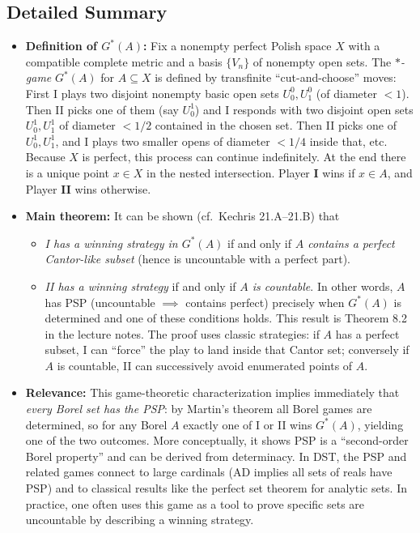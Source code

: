 \documentclass[11pt]{article}
\begin{document}
\subsection{Detailed Summary}
\label{detailed-summary-4}
\begin{itemize}
\item \textbf{Definition of \(G^*(A)\):} Fix a nonempty perfect Polish space \(X\)
with a compatible complete metric and a basis \(\{V_n\}\) of nonempty
open sets. The \emph{\(\ast\)-game} \(G^*(A)\) for \(A\subseteq X\) is
defined by transfinite “cut-and-choose” moves: First I plays two
disjoint nonempty basic open sets \(U_0^0,U_1^0\) (of diameter
\(<1\)). Then II picks one of them (say \(U^1_0\)) and I responds with
two disjoint open sets \(U_0^1,U_1^1\) of diameter \(<1/2\) contained
in the chosen set. Then II picks one of \(U_0^1,U_1^1\), and I plays
two smaller opens of diameter \(<1/4\) inside that, etc. Because \(X\)
is perfect, this process can continue indefinitely. At the end there
is a unique point \(x\in X\) in the nested intersection. Player \textbf{I}
wins if \(x\in A\), and Player \textbf{II} wins otherwise.

\item \textbf{Main theorem:} It can be shown (cf. Kechris 21.A--21.B) that

\begin{itemize}
\item \emph{I has a winning strategy in \(G^*(A)\)} if and only if \emph{\(A\)
contains a perfect Cantor-like subset} (hence is uncountable with a
perfect part).
\item \emph{II has a winning strategy} if and only if \emph{\(A\) is countable}. In
other words, \(A\) has PSP (uncountable \(\implies\) contains
perfect) precisely when \(G^*(A)\) is determined and one of these
conditions holds. This result is Theorem 8.2 in the lecture notes.
The proof uses classic strategies: if \(A\) has a perfect subset, I
can “force” the play to land inside that Cantor set; conversely if
\(A\) is countable, II can successively avoid enumerated points of
\(A\).
\end{itemize}

\item \textbf{Relevance:} This game-theoretic characterization implies immediately
that \emph{every Borel set has the PSP}: by Martin's theorem all Borel
games are determined, so for any Borel \(A\) exactly one of I or II
wins \(G^*(A)\), yielding one of the two outcomes. More conceptually,
it shows PSP is a “second-order Borel property” and can be derived
from determinacy. In DST, the PSP and related games connect to large
cardinals (AD implies all sets of reals have PSP) and to classical
results like the perfect set theorem for analytic sets. In practice,
one often uses this game as a tool to prove specific sets are
uncountable by describing a winning strategy.
\end{itemize}
\end{document}
